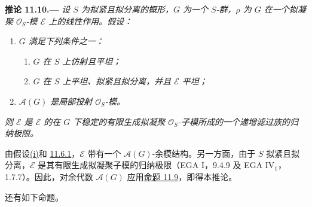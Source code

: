 \medskip
{}\label{cor:sga3-VIB-11.10}%
\noindent\textbf{推论 11.10.---}
\emph{设 \(S\) 为拟紧且拟分离的概形，\(G\) 为一个 \(S\)-群，\(\rho\) 为 \(G\) 在一个拟凝聚 \(\mathcal O_S\)-模 \(\mathcal E\) 上的线性作用。假设：}
\begin{enumerate}
\item[\textup{(i)}]\label{hyp:sga3-VIB-11.10-i}
  \emph{\(G\) 满足下列条件之一：}
  \begin{enumerate}
  \item[\textup{(a)}]\label{hyp:sga3-VIB-11.10-i-a}
    \emph{\(G\) 在 \(S\) 上仿射且平坦；}

  \item[\textup{(b)}]\label{hyp:sga3-VIB-11.10-i-b}
    \emph{\(G\) 在 \(S\) 上平坦、拟紧且拟分离，并且 \(\mathcal E\) 平坦；}
  \end{enumerate}

\item[\textup{(ii)}]\label{hyp:sga3-VIB-11.10-ii}
  \emph{\(\mathcal A(G)\) 是局部投射 \(\mathcal O_S\)-模。}
\end{enumerate}
\emph{则 \(\mathcal E\) 是 \(\mathcal E\) 的在 \(G\) 下稳定的有限生成拟凝聚 \(\mathcal O_S\)-子模所成的一个递增滤过族的归纳极限。}

由假设\hyperref[hyp:sga3-VIB-11.10-i]{\textup{(i)}}和 \hyperref[prop:sga3-VIB-11.6.1]{11.6.1}，\(\mathcal E\) 带有一个 \(\mathcal A(G)\)-余模结构。另一方面，由于 \(S\) 拟紧且拟分离，\(\mathcal E\) 是其有限生成拟凝聚子模的归纳极限\textup{（EGA I，9.4.9 及 EGA IV\(_1\)，1.7.7）}。因此，对余代数 \(\mathcal A(G)\) 应用\hyperref[prop:sga3-VIB-11.9]{命题 11.9}，即得本推论。

还有如下命题。
